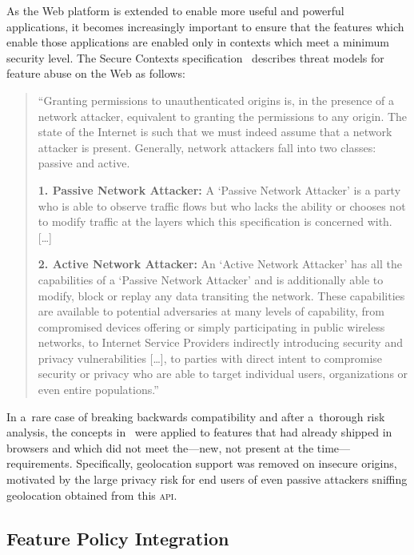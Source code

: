 \documentclass[sigconf,hyphens]{acmart}
\begin{document}
As the Web platform is extended to enable more useful and powerful applications,
it becomes increasingly important to ensure that the features
which enable those applications are enabled only in contexts
which meet a minimum security level.
The Secure Contexts specification~\cite{west2016securecontexts}
describes threat models for feature abuse on the Web as follows:

\begin{quote}
``Granting permissions to unauthenticated origins is, in the presence of a network attacker,
equivalent to granting the permissions to any origin.
The state of the Internet is such that we must indeed assume that a network attacker is present.
Generally, network attackers fall into two classes: passive and active.

\textbf{1. Passive Network Attacker:} A `Passive Network Attacker' is a party
who is able to observe traffic flows but who lacks the ability
or chooses not to modify traffic at the layers which this specification is concerned with. [\ldots]

\textbf{2. Active Network Attacker:} An `Active Network Attacker' has all the capabilities
of a `Passive Network Attacker' and is additionally able to modify, block or replay
any data transiting the network.
These capabilities are available to potential adversaries at many levels of capability,
from compromised devices offering or simply participating in public wireless networks,
to Internet Service Providers indirectly introducing security and privacy vulnerabilities [\ldots],
to parties with direct intent to compromise security or privacy who are able to target individual users,
organizations or even entire populations.''
\end{quote}

In a~rare case of breaking backwards compatibility and after a~thorough risk analysis,
the concepts in~\cite{west2016securecontexts} were applied
to features that had already shipped in browsers
and which did not meet the---new, not present at the time---requirements.
Specifically, geolocation support was removed on insecure origins,
motivated by the large privacy risk for end users of even passive attackers
sniffing geolocation obtained from this \textsc{api}.

\subsection{Feature Policy Integration}
\end{document}
